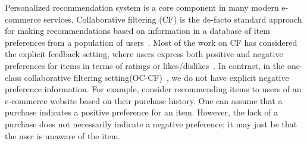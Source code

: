 Personalized recommendation system is a core component
in many modern e-commerce services. Collaborative
filtering (CF) is the de-facto standard approach for making recommendations
based on information in a database
of item preferences from a population of users~\citep{Goldberg:1992, Sarwar:2001}. Most of the work on CF has considered 
the explicit feedback
setting, where users express both positive and negative preferences
for items in terms of ratings or likes/dislikes~\citep{koren2009matrix}. In
contrast, in the one-class collaborative filtering setting(OC-CF)~\citep{Pan:2008}, we do not have
explicit negative preference information. For example, consider
recommending items to users of an e-commerce website
based on their purchase history. One can assume that a
purchase indicates a positive preference for an item. However,
the lack of a purchase does not necessarily indicate
a negative preference; it may just be that the user is unaware
of the item. 

